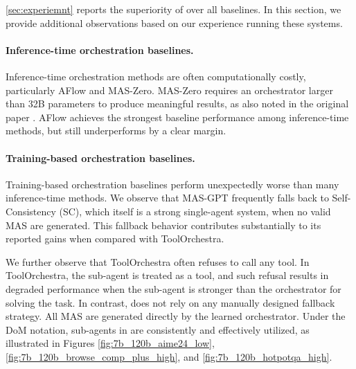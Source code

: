 \cref{sec:experiemnt} reports the superiority of \ourframework over all baselines. In this section, we provide additional observations based on our experience running these systems.

\paragraph{Inference-time orchestration baselines.}
Inference-time orchestration methods are often computationally costly, particularly AFlow and MAS-Zero. MAS-Zero requires an orchestrator larger than 32B parameters to produce meaningful results, as also noted in the original paper \citep{Ke2025MASZero}. AFlow achieves the strongest baseline performance among inference-time methods, but still underperforms \ourframework by a clear margin.

\paragraph{Training-based orchestration baselines.}
Training-based orchestration baselines perform unexpectedly worse than many inference-time methods. We observe that MAS-GPT frequently falls back to Self-Consistency (SC), which itself is a strong single-agent system, when no valid MAS are generated. This fallback behavior contributes substantially to its reported gains when compared with ToolOrchestra.

We further observe that ToolOrchestra often refuses to call any tool. In ToolOrchestra, the sub-agent is treated as a tool, and such refusal results in degraded performance when the sub-agent is stronger than the orchestrator for solving the task. In contrast, \ourframework does not rely on any manually designed fallback strategy. All MAS are generated directly by the learned orchestrator. Under the DoM notation, sub-agents in \ourframework are consistently and effectively utilized, as illustrated in Figures \ref{fig:7b_120b_aime24_low}, \ref{fig:7b_120b_browse_comp_plus_high}, and \ref{fig:7b_120b_hotpotqa_high}.

 

